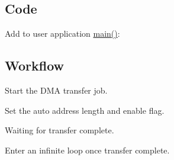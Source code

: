 \hypertarget{asfdoc_sam0_sercom_i2c_master_dma_use_case_asfdoc_sam0_sercom_i2c_master_dma_use_implemenation_code}{}\subsection{Code}\label{asfdoc_sam0_sercom_i2c_master_dma_use_case_asfdoc_sam0_sercom_i2c_master_dma_use_implemenation_code}
Add to user application {\ttfamily \mbox{\hyperlink{csc__app_8c_a840291bc02cba5474a4cb46a9b9566fe}{main()}}}\+: 
\begin{DoxyCodeInclude}{0}
\end{DoxyCodeInclude}
 \hypertarget{asfdoc_sam0_sercom_i2c_master_dma_use_case_asfdoc_sam0_sercom_i2c_master_dma_use_implemenation_workflow}{}\subsection{Workflow}\label{asfdoc_sam0_sercom_i2c_master_dma_use_case_asfdoc_sam0_sercom_i2c_master_dma_use_implemenation_workflow}

\begin{DoxyEnumerate}
\item Start the D\+MA transfer job. 
\begin{DoxyCodeInclude}{0}
\end{DoxyCodeInclude}

\item Set the auto address length and enable flag. 
\begin{DoxyCodeInclude}{0}
\end{DoxyCodeInclude}

\item Waiting for transfer complete. 
\begin{DoxyCodeInclude}{0}
\end{DoxyCodeInclude}

\item Enter an infinite loop once transfer complete. 
\begin{DoxyCodeInclude}{0}
\end{DoxyCodeInclude}

\end{DoxyEnumerate}